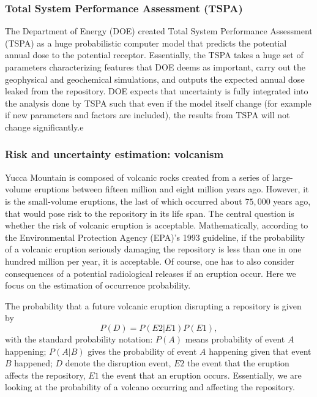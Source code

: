 \documentclass[nofootinbib,preprint,aps]{revtex4-1}
\begin{document}
        \subsubsection{Total System Performance Assessment (TSPA)}
        The Department of Energy (DOE) created Total System Performance Assessment (TSPA) as a huge probabilistic
        computer model that predicts the potential annual dose to the potential receptor.
        Essentially, the TSPA takes a huge set of parameters characterizing features that DOE deems as important,
        carry out the geophysical and geochemical simulations,
        and outputs the expected annual dose leaked from the repository.
        DOE expects that
        uncertainty is fully integrated into the analysis done by TSPA such that even if the model itself change
        (for example if new parameters and factors are included), the results from TSPA will not change
        significantly.e\cite{cv14,ocrwm02} 

        \subsubsection{Risk and uncertainty estimation: volcanism}
        \label{sec:volcano}
        Yucca Mountain is composed of volcanic rocks created from a series of large-volume eruptions between
        fifteen million and eight million years ago. However, it is the small-volume eruptions, the last of
        which occurred about $75,000$ years ago, that would pose risk to the repository in its life span.
        The central question is whether the risk of volcanic eruption is acceptable. Mathematically,
        according to the Environmental Protection Agency (EPA)'s 1993 guideline,
        if the probability of a volcanic eruption seriously damaging the repository is less than
        one in one hundred million per year, it is acceptable.\cite{epa93}
        Of course, one has to also consider consequences of a potential radiological releases if an eruption
        occur. Here we focus on the estimation of occurrence probability.

        The probability that a future volcanic eruption disrupting a repository is given by
        \begin{equation}
            \label{eq:prob}
            P(D) = P(E2|E1)P(E1),
        \end{equation}
        with the standard probability notation: 
        $P(A)$ means probability of event $A$ happening;
        $P(A|B)$ gives the probability of event $A$ happening given that event $B$ happened;
        $D$ denote the disruption event,
        $E2$ the event that the eruption affects the repository, $E1$ the event that an eruption occurs.
        Essentially, we are looking at the probability of a volcano occurring and affecting the repository.
\end{document}
